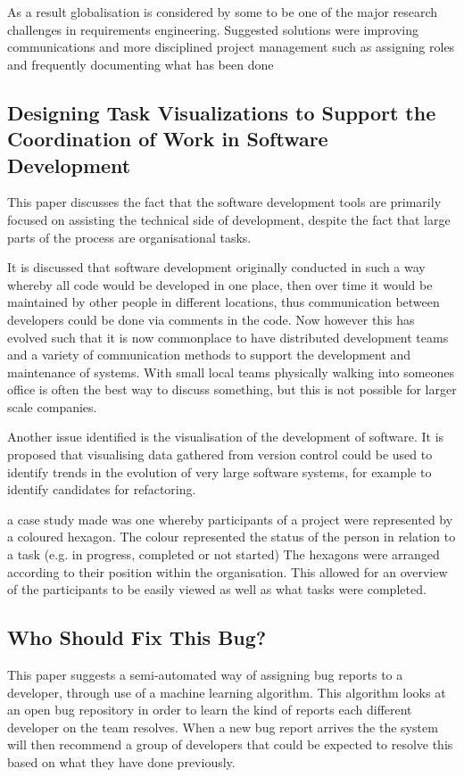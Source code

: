 \documentclass{l4proj}
\begin{document}
As a result globalisation is considered by some to be one of the major research challenges in requirements engineering.  Suggested solutions were improving communications and more disciplined project management such as assigning roles and frequently documenting what has been done


\subsection{Designing Task Visualizations to Support the Coordination of Work in Software Development}

This paper discusses the fact that the software development tools are primarily focused on assisting the technical side of development, despite the fact that large parts of the process are organisational tasks.

It is discussed that software development originally conducted in such a way whereby all code would be developed in one place, then over time it would be maintained by other people in different locations, thus communication between developers could be done via comments in the code.  Now however this has evolved such that it is now commonplace to have distributed development teams and a variety of communication methods to support the development and maintenance of systems.  With small local teams physically walking into someones office is often the best way to discuss something, but this is not possible for larger scale companies.

Another issue identified is the visualisation of the development of software.  It is proposed that visualising data gathered from version control could be used to identify trends in the evolution of very large software systems, for example to identify candidates for refactoring.  

a case study made was one whereby participants of a project were represented by a coloured hexagon.  The colour represented the status of the person in relation to a task (e.g. in progress, completed or not started)
The hexagons were arranged according to their position within the organisation.  This allowed for an overview of the participants to be easily viewed as well as what tasks were completed.


\subsection {Who Should Fix This Bug?}

This paper suggests a semi-automated way of assigning bug reports to a developer, through use of a machine learning algorithm.  This algorithm looks at an open bug repository in order to learn the kind of reports each different developer on the team resolves.  When a new bug report arrives the the system will then recommend a group of developers that could be expected to resolve this based on what they have done previously.
\end{document}

